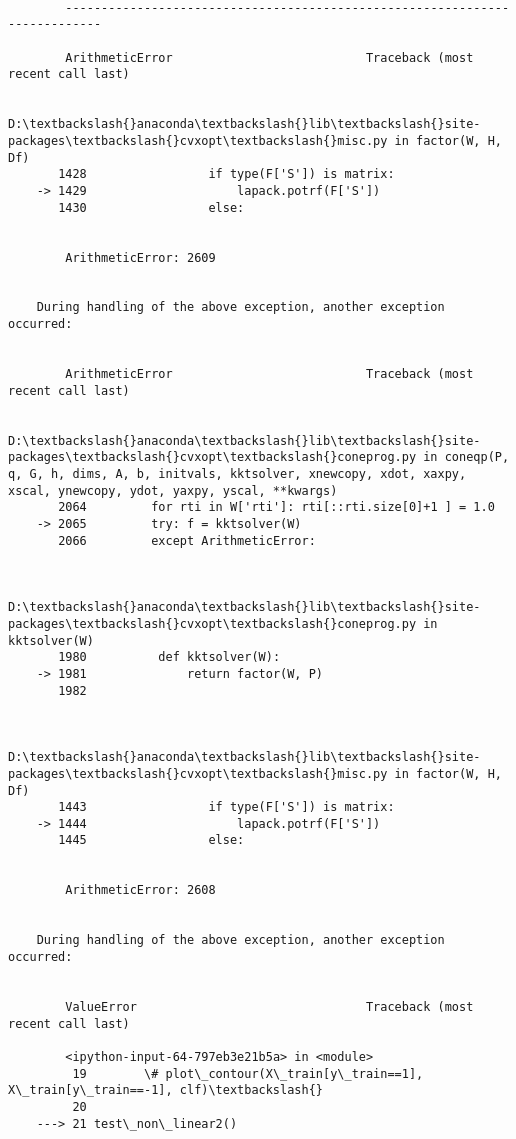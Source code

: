 \documentclass[11pt]{article}
\begin{document}
    \begin{Verbatim}[commandchars=\\\{\}]

        ---------------------------------------------------------------------------

        ArithmeticError                           Traceback (most recent call last)

        D:\textbackslash{}anaconda\textbackslash{}lib\textbackslash{}site-packages\textbackslash{}cvxopt\textbackslash{}misc.py in factor(W, H, Df)
       1428                 if type(F['S']) is matrix:
    -> 1429                     lapack.potrf(F['S'])
       1430                 else:
    

        ArithmeticError: 2609

        
    During handling of the above exception, another exception occurred:
    

        ArithmeticError                           Traceback (most recent call last)

        D:\textbackslash{}anaconda\textbackslash{}lib\textbackslash{}site-packages\textbackslash{}cvxopt\textbackslash{}coneprog.py in coneqp(P, q, G, h, dims, A, b, initvals, kktsolver, xnewcopy, xdot, xaxpy, xscal, ynewcopy, ydot, yaxpy, yscal, **kwargs)
       2064         for rti in W['rti']: rti[::rti.size[0]+1 ] = 1.0
    -> 2065         try: f = kktsolver(W)
       2066         except ArithmeticError:
    

        D:\textbackslash{}anaconda\textbackslash{}lib\textbackslash{}site-packages\textbackslash{}cvxopt\textbackslash{}coneprog.py in kktsolver(W)
       1980          def kktsolver(W):
    -> 1981              return factor(W, P)
       1982 
    

        D:\textbackslash{}anaconda\textbackslash{}lib\textbackslash{}site-packages\textbackslash{}cvxopt\textbackslash{}misc.py in factor(W, H, Df)
       1443                 if type(F['S']) is matrix:
    -> 1444                     lapack.potrf(F['S'])
       1445                 else:
    

        ArithmeticError: 2608

        
    During handling of the above exception, another exception occurred:
    

        ValueError                                Traceback (most recent call last)

        <ipython-input-64-797eb3e21b5a> in <module>
         19        \# plot\_contour(X\_train[y\_train==1], X\_train[y\_train==-1], clf)\textbackslash{}
         20 
    ---> 21 test\_non\_linear2()
    


\end{Verbatim}
\end{document}
